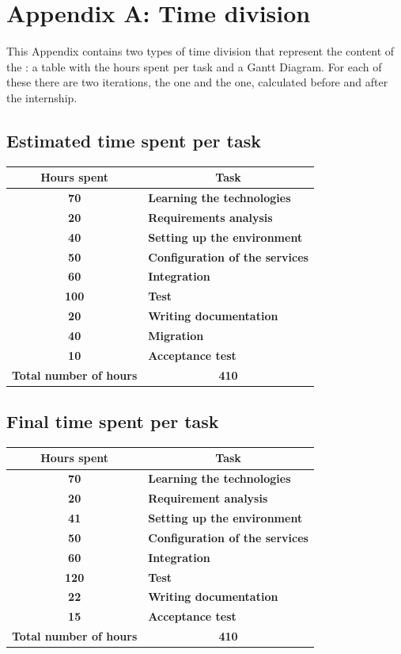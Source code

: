 \renewcommand\thechapter{A}
\chapter{Appendix A: Time division}
\label{AppendixA}

This Appendix contains two types of time division that represent the content of the : a table with the hours spent per task and a Gantt Diagram.
For each of these there are two iterations, the  one and the  one, calculated before and after the internship.

\section{Estimated time spent per task}
	\begin{tabularx}{\textwidth}{c|X}
		\centering\textbf{Hours spent} & \multicolumn{1}{c}{\textbf{Task}}\\\hline
		\textbf{70}&\textbf{Learning the technologies}\\\hline
		\textbf{20}&\textbf{Requirements analysis}\\\hline
		\textbf{40}&\textbf{Setting up the environment}\\\hline
		\textbf{50}&\textbf{Configuration of the services}\\\hline
		\textbf{60}&\textbf{Integration}\\\hline
		\textbf{100}&\textbf{Test}\\\hline
		\textbf{20}&\textbf{Writing documentation}\\\hline
		\textbf{40}&\textbf{Migration}\\\hline
		\textbf{10}&\textbf{Acceptance test}\\\hline
		\textbf{Total number of hours}&\multicolumn{1}{c}{\textbf{410}} \\	
	\end{tabularx}

\section{Final time spent per task}
	\begin{tabularx}{\textwidth}{c|X}
		\centering\textbf{Hours spent} & \multicolumn{1}{c}{\textbf{Task}}\\\hline
		\textbf{70}&\textbf{Learning the technologies}\\\hline
		\textbf{20}&\textbf{Requirement analysis}\\\hline
		\textbf{41}&\textbf{Setting up the environment}\\\hline
		\textbf{50}&\textbf{Configuration of the services}\\\hline
		\textbf{60}&\textbf{Integration}\\\hline
		\textbf{120}&\textbf{Test}\\\hline
		\textbf{22}&\textbf{Writing documentation}\\\hline
		\textbf{15}&\textbf{Acceptance test}\\\hline
		\textbf{Total number of hours}&\multicolumn{1}{c}{\textbf{410}} \\	
	\end{tabularx}

